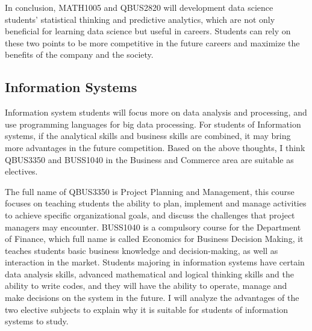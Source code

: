 \documentclass[12pt]{article}
\begin{document}
In conclusion, MATH1005 and QBUS2820 will development data science students' statistical thinking and predictive analytics, which are not only beneficial for learning data science but useful in careers. Students can rely on these two points to be more competitive in the future careers and maximize the benefits of the company and the society.

\newpage
\subsection{Information Systems}


Information system students will focus more on data analysis and processing, and use programming languages for big data processing. For students of Information systems, if the analytical skills and business skills are combined, it may bring more advantages in the future competition. Based on the above thoughts, I think QBUS3350 and BUSS1040 in the Business and Commerce area are suitable as electives.

The full name of QBUS3350 is Project Planning and Management, this course focuses on teaching students the ability to plan, implement and manage activities to achieve specific organizational goals, and discuss the challenges that project managers may encounter. BUSS1040 is a compulsory course for the Department of Finance, which full name is called Economics for Business Decision Making, it teaches students basic business knowledge and decision-making, as well as interaction in the market. Students majoring in information systems have certain data analysis skills, advanced mathematical and logical thinking skills and the ability to write codes, and they will have the ability to operate, manage and make decisions on the system in the future. I will analyze the advantages of the two elective subjects to explain why it is suitable for students of information systems to study.
\end{document}
